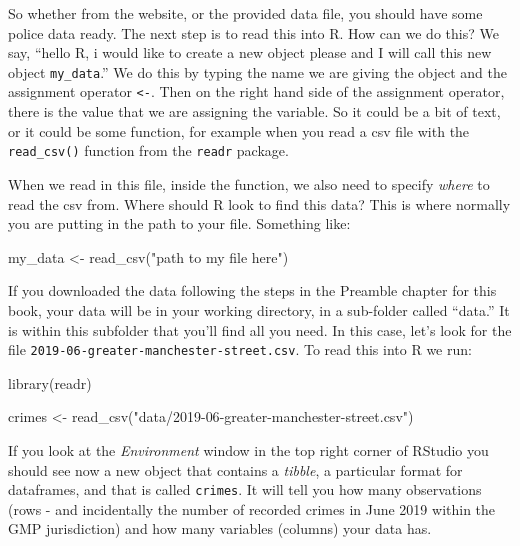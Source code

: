 \documentclass[
  krantz2]{krantz}
\makeatletter
\newenvironment{Shaded}{\begin{snugshade}}{\end{snugshade}}
\newcommand{\FunctionTok}[1]{\textcolor[rgb]{0,0,0}{#1}}
\newcommand{\NormalTok}[1]{#1}
\newcommand{\OtherTok}[1]{\textcolor[rgb]{0.37,0.37,0.37}{#1}}
\newcommand{\StringTok}[1]{\textcolor[rgb]{0.5,0.5,0.5}{#1}}
\newenvironment{kframe}{%
\medskip{}
\setlength{\fboxsep}{.8em}
 \def\at@end@of@kframe{}%
 \ifinner\ifhmode%
  \def\at@end@of@kframe{\end{minipage}}%
  \begin{minipage}{\columnwidth}%
 \fi\fi%
 \def\FrameCommand##1{\hskip\@totalleftmargin \hskip-\fboxsep
 \colorbox{shadecolor}{##1}\hskip-\fboxsep
     \hskip-\linewidth \hskip-\@totalleftmargin \hskip\columnwidth}%
 \MakeFramed {\advance\hsize-\width
   \@totalleftmargin\z@ \linewidth\hsize
   \@setminipage}}%
 {\par\unskip\endMakeFramed%
 \at@end@of@kframe}
\renewenvironment{Shaded}{\begin{kframe}}{\end{kframe}}
\makeatother
\begin{document}
So whether from the website, or the provided data file, you should have some police data ready. The next step is to read this into R. How can we do this? We say, ``hello R, i would like to create a new object please and I will call this new object \texttt{my\_data}.'' We do this by typing the name we are giving the object and the assignment operator \texttt{\textless{}-}. Then on the right hand side of the assignment operator, there is the value that we are assigning the variable. So it could be a bit of text, or it could be some function, for example when you read a csv file with the \texttt{read\_csv()} function from the \texttt{readr} package.

When we read in this file, inside the function, we also need to specify \emph{where} to read the csv from. Where should R look to find this data? This is where normally you are putting in the path to your file. Something like:

\begin{Shaded}
\begin{Highlighting}[]
\NormalTok{my\_data }\OtherTok{\textless{}{-}} \FunctionTok{read\_csv}\NormalTok{(}\StringTok{"path to my file here"}\NormalTok{)}
\end{Highlighting}
\end{Shaded}

If you downloaded the data following the steps in the Preamble chapter for this book, your data will be in your working directory, in a sub-folder called ``data.'' It is within this subfolder that you'll find all you need. In this case, let's look for the file \texttt{2019-06-greater-manchester-street.csv}. To read this into R we run:

\begin{Shaded}
\begin{Highlighting}[]
\FunctionTok{library}\NormalTok{(readr)}

\NormalTok{crimes }\OtherTok{\textless{}{-}} \FunctionTok{read\_csv}\NormalTok{(}\StringTok{"data/2019{-}06{-}greater{-}manchester{-}street.csv"}\NormalTok{)}
\end{Highlighting}
\end{Shaded}

If you look at the \emph{Environment} window in the top right corner of RStudio you should see now a new object that contains a \emph{tibble}, a particular format for dataframes, and that is called \texttt{crimes}. It will tell you how many observations (rows - and incidentally the number of recorded crimes in June 2019 within the GMP jurisdiction) and how many variables (columns) your data has.
\end{document}
